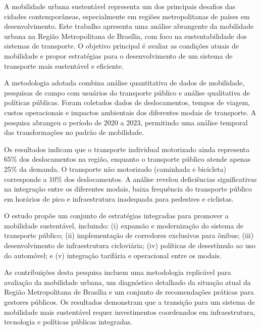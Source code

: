 \documentclass[mestrado,onehalfspacing,12pt,hyperref]{UnB-PPGT}
\begin{document}
\begin{resumo}
A mobilidade urbana sustentável representa um dos principais desafios das cidades contemporâneas, especialmente em regiões metropolitanas de países em desenvolvimento. Este trabalho apresenta uma análise abrangente da mobilidade urbana na Região Metropolitana de Brasília, com foco na sustentabilidade dos sistemas de transporte. O objetivo principal é avaliar as condições atuais de mobilidade e propor estratégias para o desenvolvimento de um sistema de transporte mais sustentável e eficiente.

A metodologia adotada combina análise quantitativa de dados de mobilidade, pesquisas de campo com usuários do transporte público e análise qualitativa de políticas públicas. Foram coletados dados de deslocamentos, tempos de viagem, custos operacionais e impactos ambientais dos diferentes modais de transporte. A pesquisa abrangeu o período de 2020 a 2023, permitindo uma análise temporal das transformações no padrão de mobilidade.

Os resultados indicam que o transporte individual motorizado ainda representa 65\% dos deslocamentos na região, enquanto o transporte público atende apenas 25\% da demanda. O transporte não motorizado (caminhada e bicicleta) corresponde a 10\% dos deslocamentos. A análise revelou deficiências significativas na integração entre os diferentes modais, baixa frequência do transporte público em horários de pico e infraestrutura inadequada para pedestres e ciclistas.

O estudo propõe um conjunto de estratégias integradas para promover a mobilidade sustentável, incluindo: (i) expansão e modernização do sistema de transporte público; (ii) implementação de corredores exclusivos para ônibus; (iii) desenvolvimento de infraestrutura cicloviária; (iv) políticas de desestímulo ao uso do automóvel; e (v) integração tarifária e operacional entre os modais.

As contribuições desta pesquisa incluem uma metodologia replicável para avaliação da mobilidade urbana, um diagnóstico detalhado da situação atual da Região Metropolitana de Brasília e um conjunto de recomendações práticas para gestores públicos. Os resultados demonstram que a transição para um sistema de mobilidade mais sustentável requer investimentos coordenados em infraestrutura, tecnologia e políticas públicas integradas.
\end{resumo}
\end{document}
